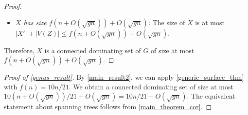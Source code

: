 \begin{proof}
\begin{itemize}
    \item \emph{$X$ has size $f(n + O(\sqrt{gn}))+O(\sqrt{gn})$:} The size of $X$ is at most $|X'| + |V(Z)|\le f(n + O(\sqrt{gn})) + O(\sqrt{gn})$.
\end{itemize}
Therefore, $X$ is a connected dominating set of $G$ of size at most $f(n+O(\sqrt{gn}))+ O(\sqrt{gn})$.
\end{proof}

\begin{proof}[Proof of \cref{genus_result}]
    By \cref{main_result2}, we can apply \cref{generic_surface_thm} with $f(n)= 10n/21$. We obtain a connected dominating set of size at most $10 (n + O(\sqrt{gn}))/21 + O(\sqrt{gn}) = 10n/21 + O(\sqrt{gn})$.  The equivalent statement about spanning trees follows from \cref{main_theorem_cor}.
\end{proof}




